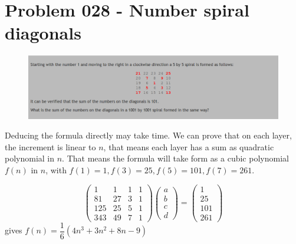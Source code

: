 \section{Problem 028 - Number spiral diagonals}
\begin{prob}
	\begin{figure}[htb!]
		\begin{center}
			\includegraphics[scale = 0.4]{pic/028.png}
		\end{center}
	\end{figure}
\end{prob}
\begin{sol}
Deducing the formula directly may take time. We can prove that on each layer, the increment is linear to $n$, that means each layer has a sum as quadratic polynomial in $n$.
 That means the formula will take form as a cubic polynomial $f(n)$ in $n$, with $f(1) = 1, f(3) = 25, f(5) = 101, f(7) = 261$.

\begin{equation}
\begin{pmatrix}
1 & 1 & 1 & 1\\
81 & 27 & 3 & 1\\
125 & 25 & 5 & 1\\
343 & 49 & 7 & 1 
\end{pmatrix} 
\begin{pmatrix}
a\\b\\c\\d
\end{pmatrix}
 = \begin{pmatrix}
1\\25\\101\\261
\end{pmatrix}
\end{equation}
gives 
$f(n) = \dfrac{1}{6}(4 n^3 + 3n^2 + 8 n - 9)$
\end{sol}

